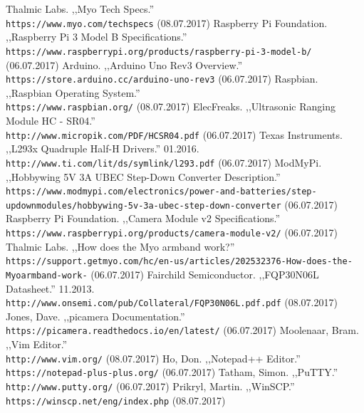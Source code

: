 \documentclass[12pt,a4paper]{report}
\begin{document}
\begin{thebibliography}{99}
Thalmic Labs. ,,Myo Tech Specs.''
\\\texttt{https://www.myo.com/techspecs}
(08.07.2017)
Raspberry Pi Foundation. ,,Raspberry Pi 3 Model B Specifications.''
\\\texttt{https://www.raspberrypi.org/products/raspberry-pi-3-model-b/}
(06.07.2017)
Arduino. ,,Arduino Uno Rev3 Overview.''
\\\texttt{https://store.arduino.cc/arduino-uno-rev3}
(06.07.2017)
Raspbian. ,,Raspbian Operating System.''
\\\texttt{https://www.raspbian.org/}
(08.07.2017)
ElecFreaks. ,,Ultrasonic Ranging Module HC - SR04.''
\\\texttt{http://www.micropik.com/PDF/HCSR04.pdf}
(06.07.2017)
Texas Instruments. ,,L293x Quadruple Half-H Drivers.'' 01.2016.
\\\texttt{http://www.ti.com/lit/ds/symlink/l293.pdf}
(06.07.2017)
ModMyPi. ,,Hobbywing 5V 3A UBEC Step-Down Converter Description.''
\\\texttt{https://www.modmypi.com/electronics/power-and-batteries/step-updown\-modules/hobbywing-5v-3a-ubec-step-down-converter}
(06.07.2017)
Raspberry Pi Foundation. ,,Camera Module v2 Specifications.''
\\\texttt{https://www.raspberrypi.org/products/camera-module-v2/}
(06.07.2017)
Thalmic Labs. ,,How does the Myo armband work?''
\\\texttt{https://support.getmyo.com/hc/en-us/articles/202532376-How-does-the-Myo\-armband-work-}
(06.07.2017)
Fairchild Semiconductor. ,,FQP30N06L Datasheet.'' 11.2013.
\\\texttt{http://www.onsemi.com/pub/Collateral/FQP30N06L.pdf.pdf}
(08.07.2017)
Jones, Dave. ,,picamera Documentation.''
\\\texttt{https://picamera.readthedocs.io/en/latest/}
(06.07.2017)
Moolenaar, Bram. ,,Vim Editor.''
\\\texttt{http://www.vim.org/}
(08.07.2017)
Ho, Don. ,,Notepad++ Editor.''
\\\texttt{https://notepad-plus-plus.org/}
(06.07.2017)
Tatham, Simon. ,,PuTTY.''
\\\texttt{http://www.putty.org/}
(06.07.2017)
Prikryl, Martin. ,,WinSCP.''
\\\texttt{https://winscp.net/eng/index.php}
(08.07.2017)

\end{thebibliography}
\end{document}
